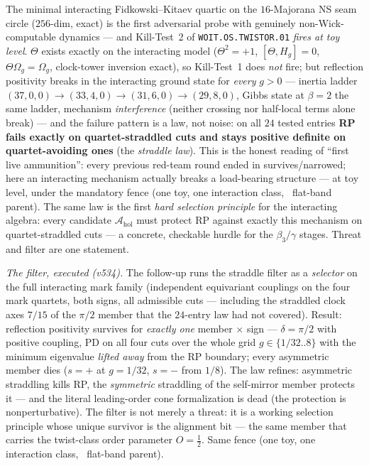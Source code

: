\documentclass[11pt,a4paper]{article}
\begin{document}
\begin{gapbox}
The minimal interacting Fidkowski--Kitaev quartic on the $16$-Majorana NS seam circle
($256$-dim, exact) is the first adversarial probe with genuinely non-Wick-computable dynamics
--- and Kill-Test~2 of \texttt{WOIT.OS.TWISTOR.01} \emph{fires at toy level}. $\Theta$ exists
exactly on the interacting model ($\Theta^2={+}1$, $[\Theta,H_g]=0$, $\Theta\Omega_g=\Omega_g$,
clock-tower inversion exact), so Kill-Test~1 does \emph{not} fire; but reflection positivity
breaks in the interacting ground state for \emph{every} $g>0$ --- inertia ladder
$(37,0,0)\to(33,4,0)\to(31,6,0)\to(29,8,0)$, Gibbs state at $\beta=2$ the same ladder, mechanism
\emph{interference} (neither crossing nor half-local terms alone break) --- and the failure
pattern is a law, not noise: on all $24$ tested entries \textbf{RP fails exactly on
quartet-straddled cuts and stays positive definite on quartet-avoiding ones} (the
\emph{straddle law}). This is the honest reading of ``first live ammunition'': every previous
red-team round ended in survives/narrowed; here an interacting mechanism actually breaks a
load-bearing structure --- at toy level, under the mandatory fence (one toy, one interaction
class, \mC\ flat-band parent). The same law is the first \emph{hard selection principle} for the
interacting algebra: every candidate $\mathcal A_{\mathrm{hol}}$ must protect RP against exactly
this mechanism on quartet-straddled cuts --- a concrete, checkable hurdle for the $\beta_3/\gamma$
stages. Threat and filter are one statement. 

\smallskip\noindent\emph{The filter, executed (v534).} The follow-up runs the straddle filter as a
\emph{selector} on the full interacting mark family (independent equivariant couplings on the four
mark quartets, both signs, all admissible cuts --- including the straddled clock axes $7/15$ of the
$\pi/2$ member that the $24$-entry law had not covered). Result: reflection positivity survives for
\emph{exactly one} member $\times$ sign --- $\delta=\pi/2$ with positive coupling, PD on all four
cuts over the whole grid $g\in\{1/32..8\}$ with the minimum eigenvalue \emph{lifted away} from the
RP boundary; every asymmetric member dies ($s{=}+$ at $g=1/32$, $s{=}-$ from $1/8$). The law
refines: asymmetric straddling kills RP, the \emph{symmetric} straddling of the self-mirror member
protects it --- and the literal leading-order cone formalization is dead (the protection is
nonperturbative). The filter is not merely a threat: it is a working selection principle whose
unique survivor is the alignment bit --- the same member that carries the twist-class order
parameter $O=\tfrac12$. Same fence (one toy, one interaction class, \mC\ flat-band parent).
\end{gapbox}
\end{document}
